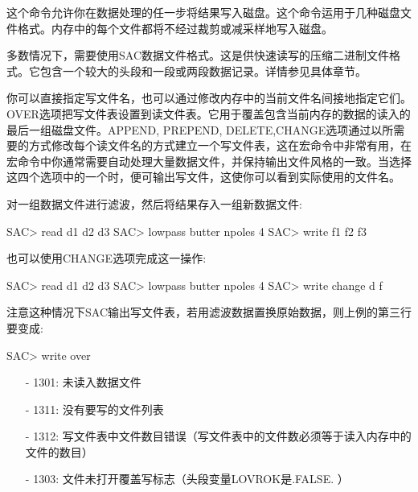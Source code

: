 这个命令允许你在数据处理的任一步将结果写入磁盘。这个命令运用于几种磁盘文件格式。内存中的每个文件都将不经过裁剪或减采样地写入磁盘。

多数情况下，需要使用SAC数据文件格式。这是供快速读写的压缩二进制文件格式。它包含一个较大的头段和一段或两段数据记录。详情参见具体章节。

你可以直接指定写文件名，也可以通过修改内存中的当前文件名间接地指定它们。OVER选项把写文件表设置到读文件表。它用于覆盖包含当前内存的数据的读入的最后一组磁盘文件。APPEND, PREPEND, DELETE,CHANGE选项通过以所需要的方式修改每个读文件名的方式建立一个写文件表，这在宏命令中非常有用，在宏命令中你通常需要自动处理大量数据文件，并保持输出文件风格的一致。当选择这四个选项中的一个时，便可输出写文件，这使你可以看到实际使用的文件名。

对一组数据文件进行滤波，然后将结果存入一组新数据文件:
\begin{SACCode}
SAC> read d1 d2 d3
SAC> lowpass butter npoles 4
SAC> write f1 f2 f3
\end{SACCode}

也可以使用CHANGE选项完成这一操作:
\begin{SACCode}
SAC> read d1 d2 d3
SAC> lowpass butter npoles 4
SAC> write change d f
\end{SACCode}

注意这种情况下SAC输出写文件表，若用滤波数据置换原始数据，则上例的第三行要变成:
\begin{SACCode}
SAC> write over
\end{SACCode}

\begin{itemize}
\item[-]1301: 未读入数据文件
\item[-]1311: 没有要写的文件列表
\item[-]1312: 写文件表中文件数目错误（写文件表中的文件数必须等于读入内存中的文件的数目）
\item[-]1303: 文件未打开覆盖写标志（头段变量LOVROK是.FALSE. ）
\end{itemize}

